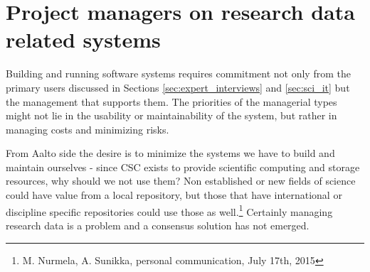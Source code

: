 \iffalse
If there was to be a system to manage and publish research data, it would have
to be maintained by someone. The obvious answer is to go to the administrators
of institutional software infrastructure.

\subsection{The goal of the interviews}

What is the stance of the administrative side on a data repository? How does it
fit the role of the infrastructure administrators? Building software systems is
not only about what people want and what existing systems prove to be the best,
human factors and elements like funding affect these decisions.

At least in Aalto the staff maintaining the infrastructure are also aware about
who are the people hosting research data on school infrastructure, making them
also knowledgeable on how things are handled right now.

\subsection{Results of the interviews}

\fi

\section{Project managers on research data related systems}

Building and running software systems requires commitment not only from the
primary users discussed in Sections \ref{sec:expert_interviews} and
\ref{sec:sci_it} but the management that supports them. The priorities of the
managerial types might not lie in the usability or maintainability of the
system, but rather in managing costs and minimizing risks.

From Aalto side the desire is to minimize the systems we have to build and
maintain ourselves - since CSC exists to provide scientific computing and
storage resources, why should we not use them? Non established or new fields
of science could have value from a local repository, but those that have
international or discipline specific repositories could use those as well.\footnote{M. Nurmela, A. Sunikka, personal communication, July 17th, 2015}
Certainly managing research data is a problem and a consensus solution has not
emerged.

